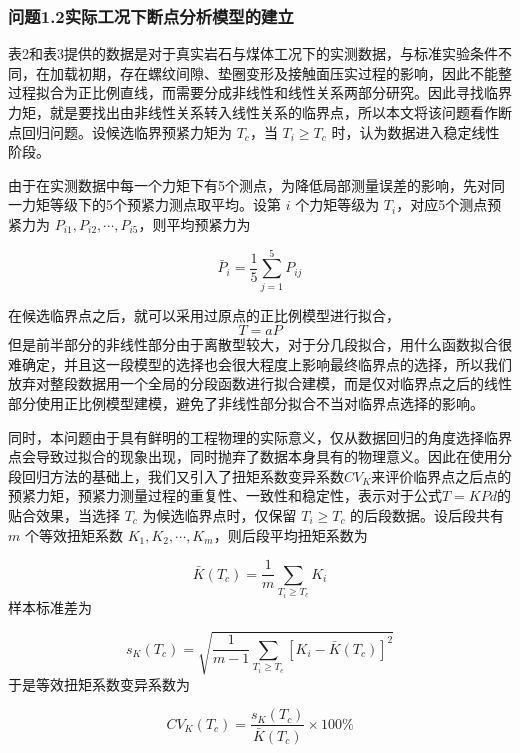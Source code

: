 \documentclass[UTF-8,a4paper,zihao=-4]{ctexart}
\begin{document}
\subsubsection{问题1.2实际工况下断点分析模型的建立}
表2和表3提供的数据是对于真实岩石与煤体工况下的实测数据，与标准实验条件不同，在加载初期，存在螺纹间隙、垫圈变形及接触面压实过程的影响，因此不能整过程拟合为正比例直线，而需要分成非线性和线性关系两部分研究。因此寻找临界力矩，就是要找出由非线性关系转入线性关系的临界点，所以本文将该问题看作断点回归问题。设候选临界预紧力矩为 $T_c$，当 $T_i\geq T_c$ 时，认为数据进入稳定线性阶段。

由于在实测数据中每一个力矩下有5个测点，为降低局部测量误差的影响，先对同一力矩等级下的5个预紧力测点取平均。设第 $i$ 个力矩等级为 $T_i$，对应5个测点预紧力为 $P_{i1},P_{i2},\cdots,P_{i5}$，则平均预紧力为

\begin{equation}
\bar{P}_i=\frac{1}{5}\sum_{j=1}^{5}P_{ij}
\end{equation}

在候选临界点之后，就可以采用过原点的正比例模型进行拟合，
\begin{equation}
T=aP
\end{equation}
但是前半部分的非线性部分由于离散型较大，对于分几段拟合，用什么函数拟合很难确定，并且这一段模型的选择也会很大程度上影响最终临界点的选择，所以我们放弃对整段数据用一个全局的分段函数进行拟合建模，而是仅对临界点之后的线性部分使用正比例模型建模，避免了非线性部分拟合不当对临界点选择的影响。

同时，本问题由于具有鲜明的工程物理的实际意义，仅从数据回归的角度选择临界点会导致过拟合的现象出现，同时抛弃了数据本身具有的物理意义。因此在使用分段回归方法的基础上，我们又引入了扭矩系数变异系数$CV_K$来评价临界点之后点的预紧力矩，预紧力测量过程的重复性、一致性和稳定性\cite{tran2026nut}，表示对于公式$T=KPd$的贴合效果，当选择 $T_c$ 为候选临界点时，仅保留 $T_i\geq T_c$ 的后段数据。设后段共有 $m$ 个等效扭矩系数 $K_1,K_2,\cdots,K_m$，则后段平均扭矩系数为

\begin{equation}
\bar{K}(T_c)=\frac{1}{m}\sum_{T_i\geq T_c}K_i
\end{equation}
样本标准差为

\begin{equation}
s_K(T_c)=
\sqrt{
\frac{1}{m-1}
\sum_{T_i\geq T_c}
\left[K_i-\bar{K}(T_c)\right]^2
}
\end{equation}
于是等效扭矩系数变异系数为\cite{GBT1231_2024}

\begin{equation}
CV_K(T_c)=\frac{s_K(T_c)}{\bar{K}(T_c)}\times 100\%
\end{equation}
\end{document}
